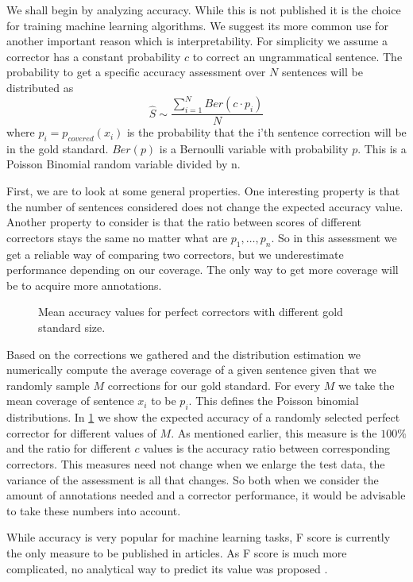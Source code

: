 \documentclass[english]{article}
\begin{document}
{ We shall begin by analyzing accuracy. While this is not published it is the choice for training machine learning algorithms. We suggest its more common use for another important reason which is interpretability.
For simplicity we assume a corrector has a constant probability $c$ to correct an ungrammatical sentence. The probability to get a specific accuracy assessment over $N$ sentences will be distributed as $$\hat{S}\sim\frac{\sum_{i=1}^{N}Ber\left(c\cdot p_i\right)}{N} $$ 
where $p_i=p_{covered}\left(x_i\right) $ is the probability that the i'th sentence correction will be in the gold standard. 
$Ber\left(p\right)$ is a Bernoulli variable with probability $p$. This is a Poisson Binomial random variable divided by n. 

First, we are to look at some general properties.
 One interesting property is that the number of sentences considered does not change the expected accuracy value.
 Another property to consider is that the ratio between scores of different correctors stays the same no matter what are $p_1,\ldots,p_n$. So in this assessment we get a reliable way of comparing two correctors, but we underestimate performance depending on our coverage. The only way to get more coverage will be to acquire more annotations.
 
 \begin{figure}
 	\caption{Mean accuracy values for perfect correctors with different gold standard size.}
 	\label{fig:accuracy_vals}
 \end{figure}
 
Based on the corrections we gathered and the distribution estimation we numerically compute the average coverage of a given sentence given that we randomly sample $M$ corrections for our gold standard. For every $M$ we take the mean coverage of sentence $x_i$ to be $p_i$. This defines the Poisson binomial distributions. In \ref{fig:accuracy_vals} we show the expected accuracy of a randomly selected perfect corrector for different values of $M$. As mentioned earlier, this measure is the $100\%$ and the ratio for different $c$ values is the accuracy ratio between corresponding correctors. This measures need not change when we enlarge the test data, the variance of the assessment is all that changes. So both when we consider the amount of annotations needed and a corrector performance, it would be advisable to take these numbers into account.

While accuracy is very popular for machine learning tasks, F score is currently the only measure to be published in articles. As F score is much more complicated, no analytical way to predict its value was proposed \cite{yeh2000more}. 

}
\end{document}
